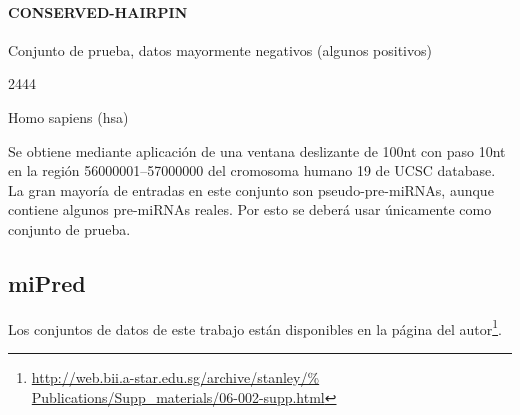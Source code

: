 \documentclass[12pt,bibliography=oldstyle,DIV=12,parskip=half-]{scrreprt}
\begin{document}
\paragraph{CONSERVED-HAIRPIN}
\begin{description}[style=nextline,leftmargin=5cm,align=right]
\item[Tipo:] Conjunto de prueba, datos mayormente negativos (algunos
  positivos)
\item[Núm. entradas:] 2444
\item[Especies:]  Homo sapiens (hsa)
\item[Descripción:] Se obtiene mediante aplicación de una ventana
  deslizante de 100nt con paso 10nt en la región 56000001--57000000
  del cromosoma humano 19 de UCSC database. La gran mayoría de
  entradas en este conjunto son pseudo-pre-miRNAs, aunque contiene
  algunos pre-miRNAs reales.  Por esto se deberá usar únicamente como
  conjunto de prueba.
\end{description}
%
%
%
%
%
%
%
%
\newpage
\subsection{miPred \cite{ng}}
Los conjuntos de datos de este trabajo están disponibles en la página
del autor\footnote{\url{http://web.bii.a-star.edu.sg/archive/stanley/%
Publications/Supp_materials/06-002-supp.html}}.
%
\end{document}
